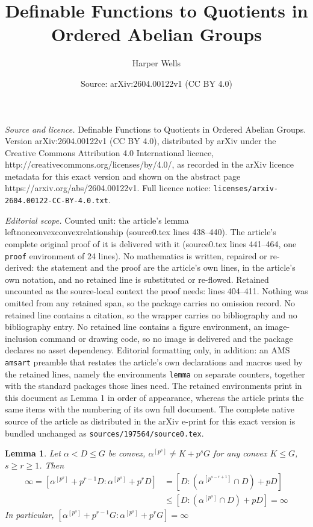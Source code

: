 \documentclass[10pt,a4paper]{amsart}
\title{Definable Functions to Quotients in Ordered Abelian Groups}
\author{Harper Wells}
\date{Source: arXiv:2604.00122v1 (CC BY 4.0)}
\newtheorem{lemma}{Lemma}
\begin{document}
\maketitle

\noindent\emph{Source and licence.} Definable Functions to Quotients in Ordered Abelian Groups. Version arXiv:2604.00122v1 (CC BY 4.0), distributed by arXiv under the Creative Commons Attribution 4.0 International licence, http://creativecommons.org/licenses/by/4.0/, as recorded in the arXiv licence metadata for this exact version and shown on the abstract page https://arxiv.org/abs/2604.00122v1. Full licence notice: \texttt{licenses/arxiv-2604.00122-CC-BY-4.0.txt}.\par\smallskip

\noindent\textit{Editorial scope.} Counted unit: the article's lemma leftnonconvexconvexrelationship (source0.tex lines 438--440). The article's complete original proof of it is delivered with it (source0.tex lines 441--464, one \texttt{proof} environment of 24 lines). No mathematics is written, repaired or re-derived: the statement and the proof are the article's own lines, in the article's own notation, and no retained line is substituted or re-flowed.  Retained uncounted as the source-local context the proof needs: lines 404--411.  Nothing was omitted from any retained span, so the package carries no omission record.  No retained line contains a citation, so the wrapper carries no bibliography and no bibliography entry.  No retained line contains a figure environment, an image-inclusion command or drawing code, so no image is delivered and the package declares no asset dependency.  Editorial formatting only, in addition: an AMS \texttt{amsart} preamble that restates the article's own declarations and macros used by the retained lines, namely the environments \texttt{lemma} on separate counters, together with the standard packages those lines need.  The retained environments print in this document as Lemma 1 in order of appearance, whereas the article prints the same items with the numbering of its own full document.  The complete native source of the article as distributed in the arXiv e-print for this exact version is bundled unchanged as \texttt{sources/197564/source0.tex}.
\begin{lemma}\label{infiniterightquotientsnonconvex}
	Let $\alpha <D\leq G$ be convex, $\alpha^{[p^s]}\neq K +p^sG$ for any convex $K\leq G$, $s\geq r\geq 1$. Then 
	\begin{align*}
		\infty=[\alpha^{[p^s]}+p^{r-1}D:\alpha^{[p^s]}+p^rD] &= [D:(\alpha^{[p^{s-r+1}]}\cap D)+pD] \\
		&\leq [D:(\alpha^{[p^s]}\cap D)+pD] = \infty
	\end{align*}
	In particular, $[\alpha^{[p^s]}+p^{r-1}G:\alpha^{[p^s]}+p^rG] =\infty$
\end{lemma}
\end{document}
